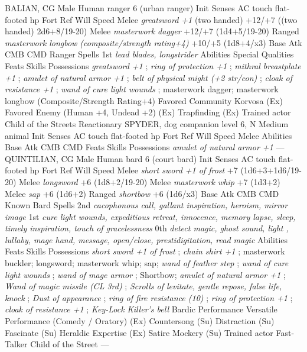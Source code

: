 BALIAN, CG Male Human ranger 6 (urban ranger)  Init Senses  AC touch flat-footed  hp  Fort Ref Will  Speed  Melee  {\itshape greatsword +1} (two handed) +12/+7 ((two handed) 2d6+8/19-20)  Melee  {\itshape masterwork dagger} +12/+7 (1d4+5/19-20)  Ranged  {\itshape masterwork longbow (composite/strength rating+4)} +10/+5 (1d8+4/x3)  Base Atk CMB CMD  Ranger Spells  1st  {\itshape lead blades, longstrider}   Abilities  Special Qualities  Feats  Skills  Possessions  {\itshape greatsword +1} ;  {\itshape ring of protection +1} ;  {\itshape mithral breastplate +1} ;  {\itshape amulet of natural armor +1} ;  {\itshape belt of physical might (+2 str/con)} ;  {\itshape cloak of resistance +1} ;  {\itshape wand of cure light wounds} ; masterwork dagger; masterwork longbow (Composite/Strength Rating+4)  Favored Community Korvosa (Ex)  Favored Enemy (Human +4, Undead +2) (Ex)  Trapfinding (Ex) Trained actor  Child of the Streets  Reactionary SPYDER, dog companion level 6, N Medium animal  Init Senses  AC touch flat-footed  hp  Fort Ref Will  Speed  Melee  Abilities  Base Atk CMB CMD  Feats  Skills  Possessions  {\itshape amulet of natural armor +1}  ---\\

QUINTILIAN, CG Male Human bard 6 (court bard)  Init Senses  AC touch flat-footed  hp  Fort Ref Will  Speed  Melee  {\itshape short sword +1 of frost} +7 (1d6+3+1d6/19-20)  Melee  {\itshape longsword} +6 (1d8+2/19-20)  Melee  {\itshape masterwork whip} +7 (1d3+2)  Melee  {\itshape sap} +6 (1d6+2)  Ranged  {\itshape shortbow} +6 (1d6/x3)  Base Atk CMB CMD  Known Bard Spells  2nd  {\itshape cacophonous call, gallant inspiration, heroism, mirror image}   1st  {\itshape cure light wounds, expeditious retreat, innocence, memory lapse, sleep, timely inspiration, touch of gracelessness}   0th  {\itshape detect magic, ghost sound, light , lullaby, mage hand, message, open/close, prestidigitation, read magic}   Abilities  Feats  Skills  Possessions  {\itshape short sword +1 of frost} ;  {\itshape chain shirt +1} ; masterwork buckler; longsword; masterwork whip; sap;  {\itshape wand of feather step} ;  {\itshape wand of cure light wounds} ;  {\itshape wand of mage armor} ; Shortbow;  {\itshape amulet of natural armor +1} ;  {\itshape Wand of magic missile (CL 3rd)} ;  {\itshape Scrolls of levitate, gentle repose, false life, knock} ;  {\itshape Dust of appearance} ;  {\itshape ring of fire resistance (10)} ;  {\itshape ring of protection +1} ;  {\itshape cloak of resistance +1} ;  {\itshape Key-Lock Killer's bell}  Bardic Performance  Versatile Performance (Comedy / Oratory) (Ex)  Countersong (Su)  Distraction (Su)  Fascinate (Su)  Heraldic Expertise (Ex)  Satire  Mockery (Su) Trained actor  Fast-Talker  Child of the Street ---\\

